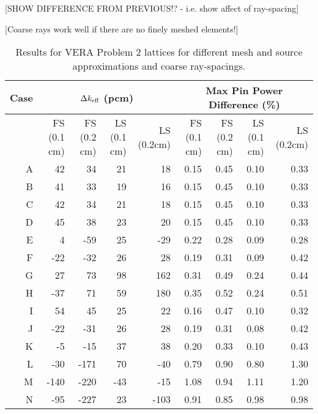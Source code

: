 {{{{        [SHOW DIFFERENCE FROM PREVIOUS!? - i.e. show affect of ray-spacing]

        [Coarse rays work well if there are no finely meshed elements!]

        \begin{table}
          \centering
          \caption{Results for VERA Problem 2 lattices for different mesh and source approximations and coarse ray-spacings.}
          \footnotesize
          \begin{tabular}{rrrrr@{\hskip 1cm}rrrr} \toprule
            Case  & \multicolumn{4}{c}{$\Delta k_{\text{eff}}$ (pcm)} & \multicolumn{4}{c}{Max Pin Power Difference (\%)}\\\midrule
                  & FS (0.1 cm) & FS (0.2 cm) & LS (0.1 cm) & LS (0.2cm) & FS (0.1 cm) & FS (0.2 cm) & LS (0.1 cm) & LS (0.2cm)\\\midrule
            A     & 42   &   34    &  21   &   18   & 0.15 & 0.45 & 0.10 & 0.33\\
            B     & 41   &   33    &  19   &   16   & 0.15 & 0.45 & 0.10 & 0.33\\
            C     & 42   &   34    &  21   &   18   & 0.15 & 0.45 & 0.10 & 0.33\\
            D     & 45   &   38    &  23   &   20   & 0.15 & 0.45 & 0.10 & 0.33\\
            E     & 4    &   -59   &  25   &   -29  & 0.22 & 0.28 & 0.09 & 0.28\\
            F     & -22  &   -32   &  26   &   28   & 0.19 & 0.31 & 0.09 & 0.42\\
            G     & 27   &   73    &  98   &   162  & 0.31 & 0.49 & 0.24 & 0.44\\
            H     & -37  &   71    &  59   &   180  & 0.35 & 0.52 & 0.24 & 0.51\\
            I     & 54   &   45    &  25   &   22   & 0.16 & 0.47 & 0.10 & 0.32\\
            J     & -22  &   -31   &  26   &   28   & 0.19 & 0.31 & 0.08 & 0.42\\
            K     & -5   &   -15   &  37   &   38   & 0.20 & 0.33 & 0.10 & 0.43\\
            L     & -30  &   -171  &  70   &   -40  & 0.79 & 0.90 & 0.80 & 1.30\\
            M     & -140 &   -220  &  -43  &   -15  & 1.08 & 0.94 & 1.11 & 1.20\\
            N     & -95  &   -227  &  23   &   -103 & 0.91 & 0.85 & 0.98 & 0.98\\

\end{tabular}
\end{table}}}}}
